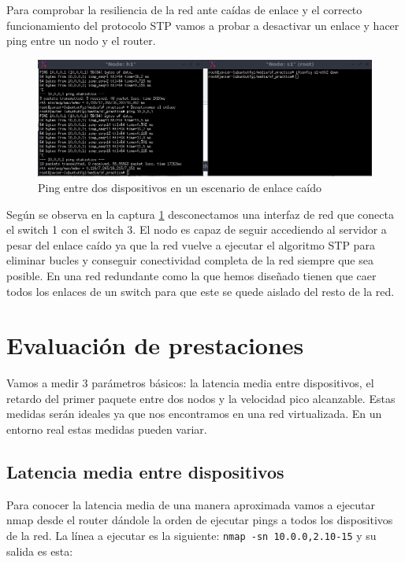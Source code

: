 Para comprobar la resiliencia de la red ante caídas de enlace y el correcto funcionamiento del protocolo STP vamos a probar a desactivar un enlace y hacer ping entre un nodo y el router.

\begin{figure}[!h]
    \centering
    \includegraphics[width=\textwidth]{imagenes/figuras/caida_enlace.png}
    \caption{Ping entre dos dispositivos en un escenario de enlace caído}
    \label{fig:caida-enlace}
\end{figure}

Según se observa en la captura \ref{fig:caida-enlace} desconectamos una interfaz de red que conecta el switch 1 con el switch 3. El nodo es capaz de seguir accediendo al servidor a pesar del enlace caído ya que la red vuelve a ejecutar el algoritmo STP para eliminar bucles y conseguir conectividad completa de la red siempre que sea posible. En una red redundante como la que hemos diseñado tienen que caer todos los enlaces de un switch para que este se quede aislado del resto de la red.


\section{Evaluación de prestaciones}

Vamos a medir 3 parámetros básicos: la latencia media entre dispositivos, el retardo del primer paquete entre dos nodos y la velocidad pico alcanzable. Estas medidas serán ideales ya que nos encontramos en una red virtualizada. En un entorno real estas medidas pueden variar.

\subsection{Latencia media entre dispositivos}

Para conocer la latencia media de una manera aproximada vamos a ejecutar nmap desde el router dándole la orden de ejecutar pings a todos los dispositivos de la red. La línea a ejecutar es la siguiente:
\lstinline{nmap -sn 10.0.0,2.10-15} y su salida es esta:

